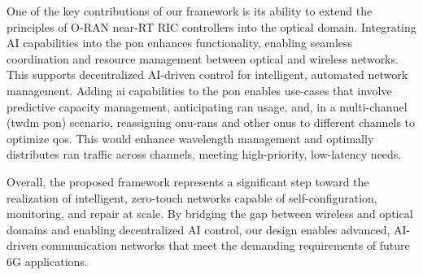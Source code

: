 {\color{black} One of the key contributions of our framework is its ability to extend the principles of O-RAN near-RT RIC controllers into the optical domain. Integrating AI capabilities into the \ac{pon} enhances functionality, enabling seamless coordination and resource management between optical and wireless networks. This supports decentralized AI-driven control for intelligent, automated network management. Adding \ac{ai} capabilities to the \ac{pon} enables use-cases that involve predictive capacity management, anticipating \ac{ran} usage, and, in a multi-channel (\ac{twdm} \ac{pon}) scenario, reassigning \ac{onu}-\acp{ran} and other \acp{onu} to different channels to optimize \ac{qos}. This would enhance wavelength management and optimally distributes \ac{ran} traffic across channels, meeting high-priority, low-latency needs.}


Overall, the proposed framework represents a significant step toward the realization of intelligent, zero-touch networks capable of self-configuration, monitoring, and repair at scale. By bridging the gap between wireless and optical domains and enabling decentralized AI control, our design enables advanced, AI-driven communication networks that meet the demanding requirements of future 6G applications.


